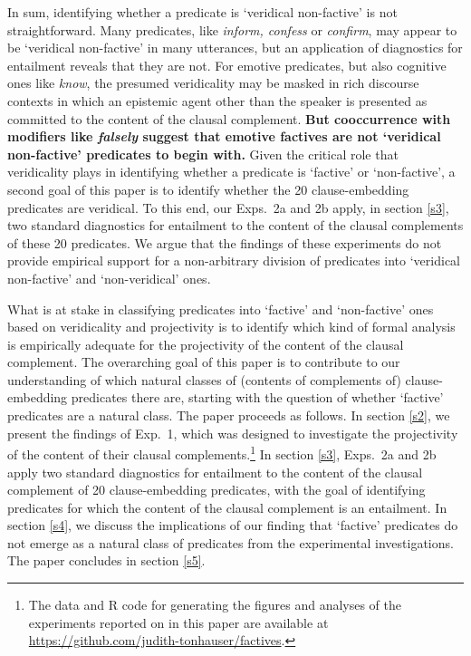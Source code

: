 \documentclass[11pt,fleqn]{article}
\newcommand{\6}{\mbox{$[\hspace*{-.6mm}[$}}
\newcommand{\9}{\mbox{$]\hspace*{-.6mm}]$}}
\begin{document}
In sum, identifying whether a predicate is `veridical non-factive' is not straightforward. Many predicates, like {\em inform, confess} or {\em confirm}, may appear to be `veridical non-factive' in many utterances, but an application of diagnostics for entailment reveals that they are not. For emotive predicates, but also cognitive ones like {\em know}, the presumed veridicality may be masked in rich discourse contexts in which an epistemic agent other than the speaker is presented as committed to the content of the clausal complement. {\bf But cooccurrence with modifiers like {\em falsely} suggest that emotive factives are not `veridical non-factive' predicates to begin with.} Given the critical role that veridicality plays in identifying whether a predicate is `factive' or `non-factive', a second goal of this paper is to identify whether the 20 clause-embedding predicates are veridical. To this end, our Exps.~2a and 2b apply, in section \ref{s3}, two standard diagnostics for entailment to the content of the clausal complements of these 20 predicates.  We argue that the findings of these experiments do not provide empirical support for a non-arbitrary division of predicates into `veridical non-factive' and `non-veridical' ones. 

What is at stake in classifying predicates into `factive' and `non-factive' ones based on veridicality and projectivity is to identify which kind of formal analysis is empirically adequate for the projectivity of the content of the clausal complement. The overarching goal of this paper is to contribute to our understanding of which natural classes of (contents of complements of) clause-embedding predicates there are, starting with the question of whether `factive' predicates are a natural class. The paper proceeds as follows. In section \ref{s2}, we present the findings of Exp.~1, which was designed to investigate the projectivity of the content of their clausal complements.\footnote{\label{f-github}The
data and R code for generating the figures and analyses of the experiments reported on in this paper are available at \url{https://github.com/judith-tonhauser/factives}.}  In section \ref{s3}, Exps.~2a and 2b apply two standard diagnostics for entailment to the content of the clausal complement of 20 clause-embedding predicates, with the goal of identifying predicates for which the content of the clausal complement is an entailment. In section \ref{s4}, we discuss the implications of our finding that `factive' predicates do not emerge as a natural class of predicates from the experimental investigations. The paper concludes in section \ref{s5}.
\end{document}
